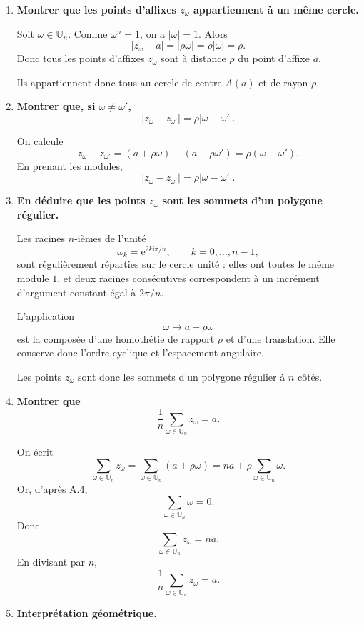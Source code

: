 \documentclass[11pt,a4paper]{article}
\newcommand{\U}{\mathbb{U}}
\newcommand{\ii}{\mathrm{i}}
\newcommand{\e}{\mathrm{e}}
\begin{document}
\begin{enumerate}[label=\textbf{B.\arabic*.}]
    \item \textbf{Montrer que les points d’affixes \(z_\omega\) appartiennent à un même cercle.}

    Soit \(\omega\in\U_n\). Comme \(\omega^n=1\), on a \(|\omega|=1\). Alors
    \[
    |z_\omega-a|=|\rho\omega|=\rho|\omega|=\rho.
    \]
    Donc tous les points d’affixes \(z_\omega\) sont à distance \(\rho\) du point d’affixe \(a\).

    Ils appartiennent donc tous au cercle de centre \(A(a)\) et de rayon \(\rho\).

    \item \textbf{Montrer que, si \(\omega\neq\omega'\),
    \[
    |z_\omega-z_{\omega'}|=\rho|\omega-\omega'|.
    \]}

    On calcule
    \[
    z_\omega-z_{\omega'}=(a+\rho\omega)-(a+\rho\omega')=\rho(\omega-\omega').
    \]
    En prenant les modules,
    \[
    |z_\omega-z_{\omega'}|=\rho|\omega-\omega'|.
    \]

    \item \textbf{En déduire que les points \(z_\omega\) sont les sommets d’un polygone régulier.}

    Les racines \(n\)-ièmes de l’unité
    \[
    \omega_k=\e^{2k\ii\pi/n},\qquad k=0,\dots,n-1,
    \]
    sont régulièrement réparties sur le cercle unité : elles ont toutes le même module \(1\), et deux racines consécutives correspondent à un incrément d’argument constant égal à \(2\pi/n\).

    L’application
    \[
    \omega\longmapsto a+\rho\omega
    \]
    est la composée d’une homothétie de rapport \(\rho\) et d’une translation. Elle conserve donc l’ordre cyclique et l’espacement angulaire.

    Les points \(z_\omega\) sont donc les sommets d’un polygone régulier à \(n\) côtés.

    \item \textbf{Montrer que
    \[
    \frac1n\sum_{\omega\in\U_n}z_\omega=a.
    \]}

    On écrit
    \[
    \sum_{\omega\in\U_n}z_\omega
    =\sum_{\omega\in\U_n}(a+\rho\omega)
    =na+\rho\sum_{\omega\in\U_n}\omega.
    \]
    Or, d’après A.4,
    \[
    \sum_{\omega\in\U_n}\omega=0.
    \]
    Donc
    \[
    \sum_{\omega\in\U_n}z_\omega=na.
    \]
    En divisant par \(n\),
    \[
    \boxed{\frac1n\sum_{\omega\in\U_n}z_\omega=a.}
    \]

    \item \textbf{Interprétation géométrique.}


\end{enumerate}
\end{document}
